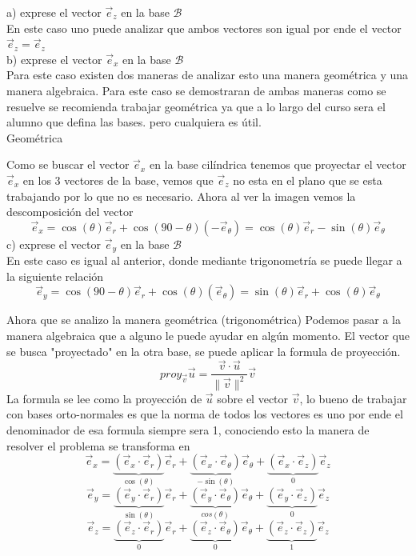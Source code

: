 \begin{sol}
    \noindent a) exprese el vector $\vec{e}_z$ en la base $\mathcal{B}$\\
En este caso uno puede analizar que ambos vectores son igual por ende el vector $\vec{e}_z=\vec{e}_z$\\
b) exprese el vector $\vec{e}_x$ en la base $\mathcal{B}$\\
Para este caso existen dos maneras de analizar esto una manera geométrica y una manera algebraica. Para este caso se demostraran de ambas maneras como se resuelve se recomienda trabajar geométrica ya que a lo largo del curso sera el alumno que defina las bases. pero cualquiera es útil.\\ 
Geométrica
%
\begin{center}
    

\end{center}



Como se buscar el vector $\vec{e}_x$ en la base cilíndrica tenemos que proyectar el vector $\vec{e}_x$ en los 3 vectores de la base, vemos que $\vec{e}_z$ no esta en el plano que se esta trabajando por lo que no es necesario. Ahora al ver la imagen vemos la descomposición del vector
$$\vec{e}_x=\cos(\theta)\vec{e}_r+\cos(90-\theta)(-\vec{e}_{\theta})=\cos(\theta)\vec{e}_r-\sin(\theta)\vec{e}_{\theta}$$
c) exprese el vector $\vec{e}_y$ en la base $\mathcal{B}$ \\
En este caso es igual al anterior, donde mediante trigonometría se puede llegar a la siguiente relación\\
$$\vec{e}_y=\cos(90-\theta)\vec{e}_r+\cos(\theta)(\vec{e}_{\theta})=\sin(\theta)\vec{e}_r+\cos(\theta)\vec{e}_{\theta}$$

Ahora que se analizo la manera geométrica (trigonométrica) Podemos pasar a la manera algebraica que a alguno le puede ayudar en algún momento. El vector que se busca "proyectado" en la otra base, se puede aplicar la formula de proyección.
$$proy_{\vec{v}}\vec{u}=\dfrac{\vec{v}\cdot\vec{u}}{\|\vec{v}\|^2}\vec{v}$$
La formula se lee como la proyección de $\vec{u}$ sobre el vector $\vec{v}$, lo bueno de trabajar con bases orto-normales es que la norma de todos los vectores es uno por ende el denominador de esa formula siempre sera 1, conociendo esto la manera de resolver el problema se transforma en 
$$\vec{e}_x=\underbrace{(\vec{e}_x\cdot\vec{e}_r)}_{\cos(\theta)}\vec{e}_r+\underbrace{(\vec{e}_x\cdot\vec{e}_{\theta})}_{-\sin(\theta)}\vec{e}_{\theta}+\underbrace{(\vec{e}_x\cdot\vec{e}_z)}_{0}\vec{e}_z$$
$$\vec{e}_y=\underbrace{(\vec{e}_y\cdot\vec{e}_r)}_{\sin(\theta)}\vec{e}_r+\underbrace{(\vec{e}_y\cdot\vec{e}_{\theta})}_{cos(\theta)}\vec{e}_{\theta}+\underbrace{(\vec{e}_y\cdot\vec{e}_z)}_{0}\vec{e}_z$$
$$\vec{e}_z=\underbrace{(\vec{e}_z\cdot\vec{e}_r)}_{0}\vec{e}_r+\underbrace{(\vec{e}_z\cdot\vec{e}_{\theta})}_{0}\vec{e}_{\theta}+\underbrace{(\vec{e}_z\cdot\vec{e}_z)}_{1}\vec{e}_z$$



\end{sol}
